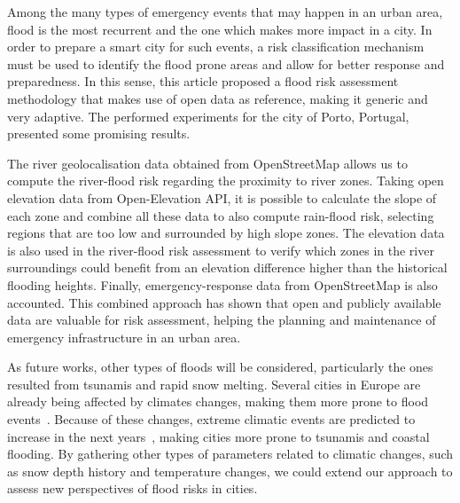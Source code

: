 \begin{refsection}
Among the many types of emergency events that may happen in an urban area, flood is the most recurrent and the one which makes more impact in a city. In order to prepare a smart city for such events, a risk classification mechanism must be used to identify the flood prone areas and allow for better response and preparedness. In this sense, this article proposed a flood risk assessment methodology that makes use of open data as reference, making it generic and very adaptive. The performed experiments for the city of Porto, Portugal, presented some promising results.

The river geolocalisation data obtained from OpenStreetMap allows us to compute the river-flood risk regarding the proximity to river zones. Taking open elevation data from Open-Elevation API, it is possible to calculate the slope of each zone and combine all these data to also compute rain-flood risk, selecting regions that are too low and surrounded by high slope zones. The elevation data is also used in the river-flood risk assessment to verify which zones in the river surroundings could benefit from an elevation difference higher than the historical flooding heights. Finally, emergency-response data from OpenStreetMap is also accounted. This combined approach has shown that open and publicly available data are valuable for risk assessment, helping the planning and maintenance of emergency infrastructure in an urban area.

As future works, other types of floods will be considered, particularly the ones resulted from tsunamis and rapid snow melting. Several cities in Europe are already being affected by climates changes, making them more prone to flood events~\cite{warming}. Because of these changes, extreme climatic events are predicted to increase in the next years~\cite{warming2}, making cities more prone to tsunamis and coastal flooding. By gathering other types of parameters related to climatic changes, such as snow depth history and temperature changes, we could extend our approach to assess new perspectives of flood risks in cities.

\printbibliography[heading=subbibliography]

\end{refsection}
